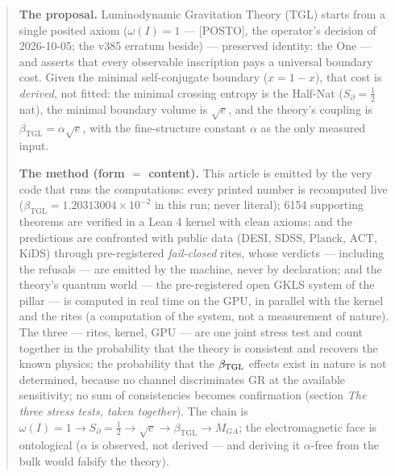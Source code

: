 \documentclass[11pt]{article}
\newcommand{\bTGL}{\beta_{\mathrm{TGL}}}\newcommand{\Msun}{M_{\odot}}\newcommand{\TGL}{\mathrm{TGL}}
\theoremstyle{definition}\newtheorem{deriv}{Derivation}
\begin{document}
\begin{abstract}

\textbf{The proposal.} Luminodynamic Gravitation Theory (TGL) starts from a single posited axiom ($\omega(I)=1$ --- \textsf{[POSTO]}, the operator's decision of 2026-10-05; the v385 erratum beside) --- preserved identity: the One --- and asserts that every observable inscription pays a universal boundary cost. Given the minimal self-conjugate boundary ($x=1-x$), that cost is \emph{derived}, not fitted: the minimal crossing entropy is the Half-Nat ($S_\partial=\tfrac12$ nat), the minimal boundary volume is $\sqrt e$, and the theory's coupling is $\bTGL=\alpha\sqrt e$, with the fine-structure constant $\alpha$ as the only measured input.

\textbf{The method (form $=$ content).} This article is emitted by the very code that runs the computations: every printed number is recomputed live ($\bTGL=1.20313004\times10^{-2}$ in this run; never literal); 6154 supporting theorems are verified in a Lean 4 kernel with clean axioms; and the predictions are confronted with public data (DESI, SDSS, Planck, ACT, KiDS) through pre-registered \emph{fail-closed} rites, whose verdicts --- including the refusals --- are emitted by the machine, never by declaration; and the theory's quantum world --- the pre-registered open GKLS system of the pillar --- is computed in real time on the GPU, in parallel with the kernel and the rites (a computation of the system, not a measurement of nature). The three --- rites, kernel, GPU --- are one joint stress test and count together in the probability that the theory is consistent and recovers the known physics; the probability that the $\beta_{\rm TGL}$ effects exist in nature is not determined, because no channel discriminates GR at the available sensitivity; no sum of consistencies becomes confirmation (section \emph{The three stress tests, taken together}). The chain is $\omega(I)=1\to S_\partial=\tfrac12\to\sqrt e\to\bTGL\to M_{GA}$; the electromagnetic face is ontological ($\alpha$ is observed, not derived --- and deriving it $\alpha$-free from the bulk would falsify the theory).


\end{abstract}
\end{document}
